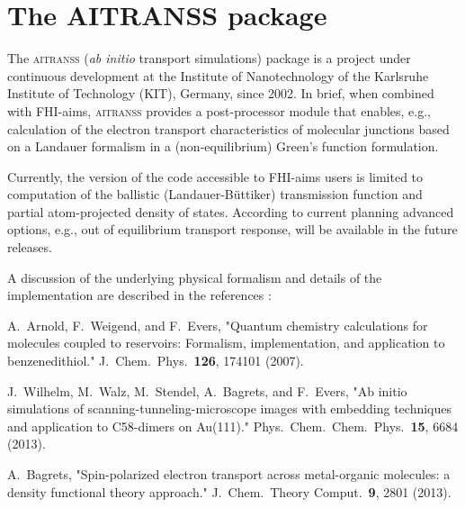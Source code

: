 \documentclass[12pt,a4paper,twoside,openany,titlepage,final]{book}
\begin{document}








%











\chapter[The AITRANSS package]{The {\LARGE AITRANSS} package}
\label{Ch:aitranss}

The \textsc{aitranss} ({\it ab initio} transport simulations) package is 
a project under continuous development at the Institute of Nanotechnology 
of the Karlsruhe Institute of Technology (KIT), Germany, since 2002. In 
brief, when combined with FHI-aims, \textsc{aitranss} provides a 
post-processor module that enables, e.g., calculation of the electron 
transport characteristics of molecular junctions based on a Landauer 
formalism in a (non-equilibrium) Green's function formulation.

Currently, the version of the code accessible to FHI-aims users is
limited to computation of the ballistic (Landauer-B\"uttiker) transmission
function and partial atom-projected density of states. 
According to current planning advanced options, e.g., out of
equilibrium transport response, will be available in the future releases.

A discussion of the underlying physical formalism and details of the
implementation are described in the references \cite{Arnold2007,Wilhelm2013,Bagrets2013}:

\begin{center}
\parbox[c]{0.85\textwidth}
{\small
A.\ Arnold, F.\ Weigend, and F.\ Evers,
"Quantum chemistry calculations for molecules coupled to reservoirs:
Formalism, implementation, and application to benzenedithiol."
J.\ Chem.\ Phys.\ \textbf{126}, 174101 (2007).
}
\medskip

\parbox[c]{0.85\textwidth}
{\small
J.\ Wilhelm, M.\ Walz, M.\ Stendel, A.\ Bagrets, and F.\ Evers,
"Ab initio simulations of scanning-tunneling-microscope
images with embedding techniques and application to C58-dimers 
on Au(111)." Phys.\ Chem.\ Chem.\ Phys.\ \textbf{15}, 6684 (2013).
}
\medskip

\parbox[c]{0.85\textwidth}
{\small
A.\ Bagrets, "Spin-polarized electron transport across metal-organic 
molecules: a density functional theory approach." 
J.\ Chem.\ Theory Comput.\ \textbf{9}, 2801 (2013).
}
\medskip

\end{center}
\end{document}
